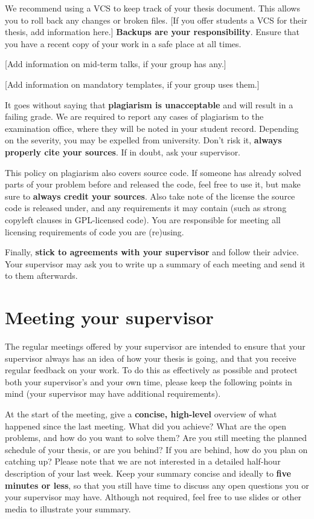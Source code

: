 \documentclass[a4paper, 11pt, hidelinks]{article}
\begin{document}
We recommend using a VCS to keep track of your thesis document.
This allows you to roll back any changes or broken files.
[If you offer students a VCS for their thesis, add information here.]
\textbf{Backups are your responsibility}.
Ensure that you have a recent copy of your work in a safe place at all times.

[Add information on mid-term talks, if your group has any.]

[Add information on mandatory templates, if your group uses them.]

It goes without saying that \textbf{plagiarism is unacceptable} and will result in a failing grade.
We are required to report any cases of plagiarism to the examination office, where they will be noted in your student record.
Depending on the severity, you may be expelled from university.
Don't risk it, \textbf{always properly cite your sources}.
If in doubt, ask your supervisor.

This policy on plagiarism also covers source code.
If someone has already solved parts of your problem before and released the code, feel free to use it, but make sure to \textbf{always credit your sources}.
Also take note of the license the source code is released under, and any requirements it may contain (such as strong copyleft clauses in GPL-licensed code).
You are responsible for meeting all licensing requirements of code you are (re)using.

Finally, \textbf{stick to agreements with your supervisor} and follow their advice.
Your supervisor may ask you to write up a summary of each meeting and send it to them afterwards.

\section*{Meeting your supervisor}
The regular meetings offered by your supervisor are intended to ensure that your supervisor always has an idea of how your thesis is going, and that you receive regular feedback on your work.
To do this as effectively as possible and protect both your supervisor’s and your own time, please keep the following points in mind (your supervisor may have additional requirements).

At the start of the meeting, give a \textbf{concise, high-level} overview of what happened since the last meeting.
What did you achieve?
What are the open problems, and how do you want to solve them?
Are you still meeting the planned schedule of your thesis, or are you behind?
If you are behind, how do you plan on catching up?
Please note that we are not interested in a detailed half-hour description of your last week.
Keep your summary concise and ideally to \textbf{five minutes or less}, so that you still have time to discuss any open questions you or your supervisor may have.
Although not required, feel free to use slides or other media to illustrate your summary.
\end{document}
